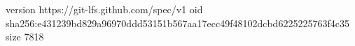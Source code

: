 version https://git-lfs.github.com/spec/v1
oid sha256:e431239bd829a96970ddd53151b567aa17ecc49f48102dcbd6225225763f4c35
size 7818
